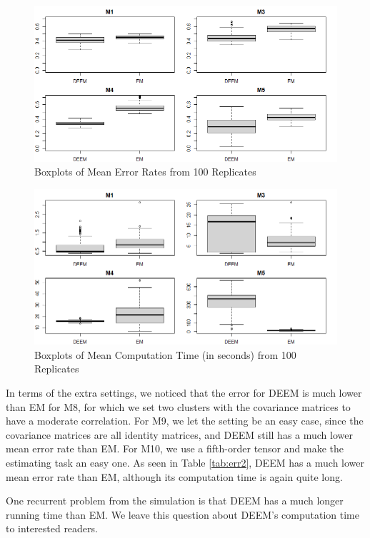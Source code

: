 \documentclass[11pt]{article}
\begin{document}
\begin{figure}[H]
    \centering
    \includegraphics[width = 16 cm]{sim_error.png}
    \caption{Boxplots of Mean Error Rates from 100 Replicates}
    \label{fig:err}
\end{figure}

\begin{figure}[H]
    \centering
    \includegraphics[width = 16 cm]{sim_time.png}
    \caption{Boxplots of Mean Computation Time (in seconds) from 100 Replicates}
    \label{fig:time}
\end{figure}

In terms of the extra settings, we noticed that the error for DEEM is much lower than EM for M8, for which we set two clusters with the covariance matrices to have a moderate correlation. For M9, we let the setting be an easy case, since the covariance matrices are all identity matrices, and DEEM still has a much lower mean error rate than EM. For M10, we use a fifth-order tensor and make the estimating task an easy one. As seen in Table \ref{tab:err2}, DEEM has a much lower mean error rate than EM, although its computation time is again quite long. 

One recurrent problem from the simulation is that DEEM has a much longer running time than EM. We leave this question about DEEM's computation time to interested readers.
\end{document}
